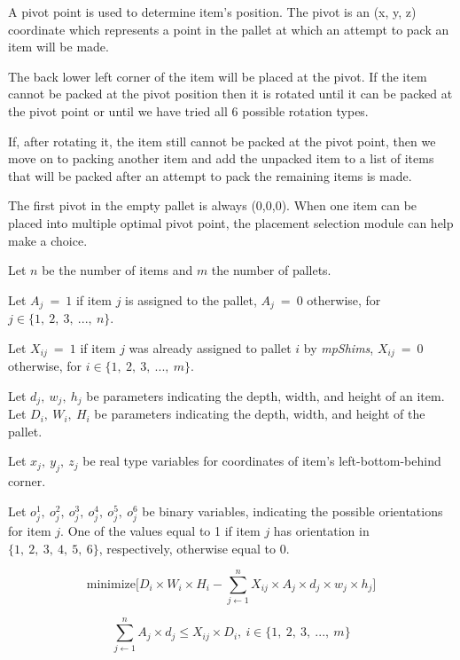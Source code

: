 \documentclass[preprint,authoryear]{elsarticle}
\begin{document}
A pivot point is used to determine item's position. The pivot is an (x, y, z) coordinate which represents a point in the pallet at which an attempt to pack an item will be made.

The back lower left corner of the item will be placed at the pivot. If the item cannot be packed at the pivot position then it is rotated until it can be packed at the pivot point or until we have tried all 6 possible rotation types.

If, after rotating it, the item still cannot be packed at the pivot point, then we move on to packing another item and add the unpacked item to a list of items that will be packed after an attempt to pack the remaining items is made.

The first pivot in the empty pallet is always (0,0,0). When one item can be placed into multiple optimal pivot point, the placement selection module can help make a choice.

Let $n$ be the number of items and $m$ the number of pallets.

Let $A_{j}\ =\ 1$ if item $j$ is assigned to the pallet, $A_{j}\ =\ 0$ otherwise, for $j \in \{1,\ 2,\ 3,\ ...,\ n\}$.

Let $X_{ij}\ =\ 1$ if item $j$ was already assigned to pallet $i$ by {\it mpShims}, $X_{ij}\ =\ 0$ otherwise, for $i \in \{1,\ 2,\ 3,\ ...,\ m\}$.

Let $d_j,\ w_j,\ h_j$ be parameters indicating the depth, width, and height of an item. 
Let $D_i,\ W_i,\ H_i$ be parameters indicating the depth, width, and height of the pallet.

Let $x_j,\ y_j,\ z_j$ be real type variables for coordinates of item's left-bottom-behind corner.

Let $o_j^1,\ o_j^2,\ o_j^3,\ o_j^4,\ o_j^5,\ o_j^6$ be binary variables, indicating the possible orientations for item $j$. One of the values equal to 1 if item $j$ has orientation in $\{1,\ 2,\ 3,\ 4,\ 5,\ 6\}$, respectively, otherwise equal to 0.


\begin{equation} \label{eq:3dpacking1}
	\mbox{minimize} \Big [ D_i \times W_i \times H_i - \sum_{j \gets 1}^{n} X_{ij} \times A_{j} \times d_j \times w_j \times h_j \Big ]
\end{equation}

\begin{equation} \label{eq:3dpacking2}
	\sum_{j \gets 1}^{n} A_{j} \times d_j  \leq X_{ij} \times D_i,\ i \in \{1,\ 2,\ 3,\ ...,\ m\}
\end{equation}
\end{document}
